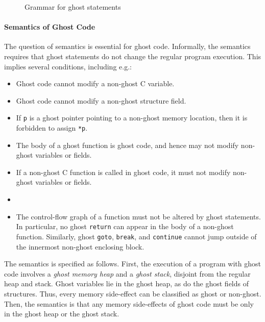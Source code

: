 \begin{figure}[htp]
  \begin{cadre}
      
    \end{cadre}
  \caption{Grammar for ghost statements}
\label{fig:gram:ghost}
\end{figure}


\paragraph{Semantics of Ghost Code}
\label{sec:semantics-ghost-code}
The question of semantics is essential for ghost code. Informally, the
semantics requires that ghost statements do not change the regular
program execution. This implies several conditions, including e.g.:
\begin{itemize}
\item Ghost code cannot modify a non-ghost C variable.
\item Ghost code cannot modify a non-ghost structure field.
\item If \lstinline|p| is a ghost pointer pointing to a non-ghost
  memory location, then it is forbidden to assign \lstinline|*p|.
\item The body of a ghost function is ghost code, and hence may not modify
  non-ghost variables or fields.
\item If a non-ghost C function is called in ghost code, it must not
  modify non-ghost variables or fields.
\item {}
\item The control-flow graph of a function must not be altered by
  ghost statements. In particular, no ghost \lstinline|return| can appear
  in the body of a non-ghost function. Similarly, ghost
  \lstinline|goto|, \lstinline|break|, and
  \lstinline|continue| cannot jump
  outside of the innermost non-ghost enclosing block.
\end{itemize}

The semantics is specified as follows. First, the
execution of a program with ghost code involves a \emph{ghost memory heap}
and a \emph{ghost stack}, disjoint from the regular heap and stack.
Ghost variables lie in the ghost heap, as do the ghost fields of
structures. Thus, every memory side-effect can be classified as ghost
or non-ghost. Then, the semantics is that any memory side-effects of ghost
code must be only in the ghost heap or the ghost stack.


